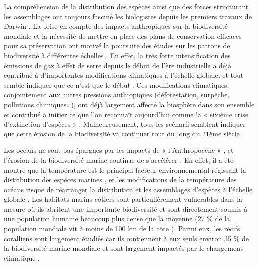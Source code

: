 La compréhension de la distribution des espèces ainsi que des forces structurant les assemblages ont toujours fasciné les biologistes depuis les premiers travaux de Darwin \citep{darwin_origin_1859}. La prise en compte des impacts anthropiques sur la biodiversité mondiale et la nécessité de mettre en place des plans de conservation efficaces pour sa préservation \citep{margules_systematic_2000} ont motivé la poursuite des études sur les patrons de biodiversité à différentes échelles \citep{rosa_multiscale_2017}. En effet, la très forte intensification des émissions de gaz à effet de serre depuis le début de l’ère industrielle a déjà contribué à d’importantes modifications climatiques à l’échelle globale, et tout semble indiquer que ce n’est que le début \citep{ipcc_climate_2014, ipcc_climate_2019}. Ces modifications climatiques, conjointement aux autres pressions anthropiques (déforestation, surpêche, pollutions chimiques…), ont déjà largement affecté la biosphère dans son ensemble et contribué à initier ce que l’on reconnaît aujourd’hui comme la « sixième crise d’extinction d’espèces » \citep{barnosky_has_2011, dirzo_defaunation_2014, ceballos_accelerated_2015}. Malheureusement, tous les scénarii semblent indiquer que cette érosion de la biodiversité va continuer tout du long du 21ème siècle \citep{pereira_scenarios_2010, tittensor_mid-term_2014, visconti_projecting_2016}.

Les océans ne sont pas épargnés par les impacts de « l’Anthropocène » \citep{mcgill_fifteen_2015}, et l’érosion de la biodiversité marine continue de s’accélérer \citep{mccauley_marine_2015, bindoff_changing_2019, ohara_mapping_2019}. En effet, il a été montré que la température est le principal facteur environnemental régissant la distribution des espèces marines \citep{tittensor_global_2010}, et les modifications de la température des océans risque de réarranger la distribution et les assemblages d’espèces à l’échelle globale \citep{pereira_scenarios_2010, tittensor_global_2010, poloczanska_responses_2016}. Les habitats marins côtiers sont particulièrement vulnérables dans la mesure où ils abritent une importante biodiversité \citep{halpern_global_2008} et sont directement soumis à une population humaine beaucoup plus dense que la moyenne (27 \% de la population mondiale vit à moins de 100 km de la côte \citep{kummu_over_2016}). Parmi eux, les récifs coralliens sont largement étudiés car ils contiennent à eux seuls environ 35 \% de la biodiversité marine mondiale \citep{reaka-kudla_biodiversity_2005} et sont largement impactés par le changement climatique \citep{hoegh-guldberg_coral_2007, death_27-year_2012, graham_predicting_2015, hughes_coral_2017}.

